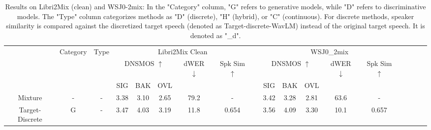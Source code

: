 \documentclass[conference]{IEEEtran}
\begin{document}
\begin{table}
  \caption{Results on Libri2Mix (clean) and WSJ0-2mix: In the "Category" column, "G" refers to generative models, while "D" refers to discriminative models. The "Type" column categorizes methods as "D" (discrete), "H" (hybrid), or "C" (continuous).
  For discrete methods, speaker similarity is compared against the discretized target speech (denoted as Target-discrete-WavLM) instead of the original target speech. It is denoted as "\_d".}
  \renewcommand{\arraystretch}{1.2}
  \begin{center}
  \begin{tabular}{cccccccccccccccccc}
    \Xhline{2\arrayrulewidth} %
  \multirow{3}{*}{System} & \multicolumn{1}{l}{\multirow{3}{*}{Category}} & \multicolumn{1}{l}{\multirow{3}{*}{Type}} &  \multicolumn{5}{c}{Libri2Mix Clean}                    &                               & \multicolumn{5}{c}{WSJ0\_2mix}                                                  \\
  \cline{4-8} \cline{10-14}
                          & \multicolumn{1}{l}{}                                                 & \multicolumn{1}{l}{}                            & \multicolumn{3}{c}{DNSMOS $\uparrow$} & dWER $\downarrow$ & Spk Sim $\uparrow$ &  & \multicolumn{3}{c}{DNSMOS $\uparrow$} & dWER $\downarrow$ & Spk Sim $\uparrow$  \\ \cline{4-6} \cline{10-12}
                          & \multicolumn{1}{l}{}                                                    & \multicolumn{1}{l}{}                            & SIG         & BAK        & OVL        &                   &        &             & SIG         & BAK        & OVL        &                   &                    \\ \hline
  Mixture                 & -                                             & -                                                                                           & 3.38        & 3.10       & 2.65       & 79.2            & -        &           & 3.42        & 3.28       & 2.81       & 63.6            & -                  \\
  Target-Discrete         & G                                             & -                                                                                          & 3.47       & 4.03       & 3.19       & 11.8            & 0.654     &          & 3.56        & 4.09       & 3.30       & 10.1            & 0.657               \\ \hline

\end{tabular}
\end{center}
\end{table}
\end{document}
